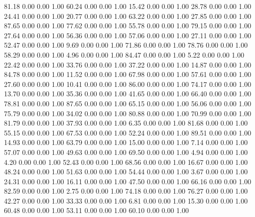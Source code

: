    81.18   0.00   0.00   1.00
   60.24   0.00   0.00   1.00
   15.42   0.00   0.00   1.00
   28.78   0.00   0.00   1.00
   24.41   0.00   0.00   1.00
   20.77   0.00   0.00   1.00
   63.22   0.00   0.00   1.00
   27.85   0.00   0.00   1.00
   87.65   0.00   0.00   1.00
   77.62   0.00   0.00   1.00
   55.78   0.00   0.00   1.00
   79.15   0.00   0.00   1.00
   27.64   0.00   0.00   1.00
   56.36   0.00   0.00   1.00
   57.06   0.00   0.00   1.00
   27.11   0.00   0.00   1.00
   52.47   0.00   0.00   1.00
    9.69   0.00   0.00   1.00
   71.86   0.00   0.00   1.00
   78.76   0.00   0.00   1.00
   58.29   0.00   0.00   1.00
    4.96   0.00   0.00   1.00
   84.47   0.00   0.00   1.00
    5.22   0.00   0.00   1.00
   22.42   0.00   0.00   1.00
   33.76   0.00   0.00   1.00
   37.22   0.00   0.00   1.00
   14.87   0.00   0.00   1.00
   84.78   0.00   0.00   1.00
   11.52   0.00   0.00   1.00
   67.98   0.00   0.00   1.00
   57.61   0.00   0.00   1.00
   27.60   0.00   0.00   1.00
   10.41   0.00   0.00   1.00
   86.00   0.00   0.00   1.00
   74.17   0.00   0.00   1.00
   13.70   0.00   0.00   1.00
   35.36   0.00   0.00   1.00
   41.65   0.00   0.00   1.00
   66.40   0.00   0.00   1.00
   78.81   0.00   0.00   1.00
   87.65   0.00   0.00   1.00
   65.15   0.00   0.00   1.00
   56.06   0.00   0.00   1.00
   75.79   0.00   0.00   1.00
   34.02   0.00   0.00   1.00
   80.88   0.00   0.00   1.00
   70.99   0.00   0.00   1.00
   81.79   0.00   0.00   1.00
   37.93   0.00   0.00   1.00
    6.35   0.00   0.00   1.00
   81.68   0.00   0.00   1.00
   55.15   0.00   0.00   1.00
   67.53   0.00   0.00   1.00
   52.24   0.00   0.00   1.00
   89.51   0.00   0.00   1.00
   14.93   0.00   0.00   1.00
   63.79   0.00   0.00   1.00
   15.00   0.00   0.00   1.00
    7.14   0.00   0.00   1.00
   57.07   0.00   0.00   1.00
   49.63   0.00   0.00   1.00
   69.50   0.00   0.00   1.00
    4.94   0.00   0.00   1.00
    4.20   0.00   0.00   1.00
   52.43   0.00   0.00   1.00
   68.56   0.00   0.00   1.00
   16.67   0.00   0.00   1.00
   48.24   0.00   0.00   1.00
   51.63   0.00   0.00   1.00
   54.44   0.00   0.00   1.00
    3.67   0.00   0.00   1.00
   24.31   0.00   0.00   1.00
   16.11   0.00   0.00   1.00
   47.50   0.00   0.00   1.00
   66.16   0.00   0.00   1.00
   82.59   0.00   0.00   1.00
    2.75   0.00   0.00   1.00
   74.18   0.00   0.00   1.00
   76.27   0.00   0.00   1.00
   42.27   0.00   0.00   1.00
   33.33   0.00   0.00   1.00
    6.81   0.00   0.00   1.00
   15.30   0.00   0.00   1.00
   60.48   0.00   0.00   1.00
   53.11   0.00   0.00   1.00
   60.10   0.00   0.00   1.00
